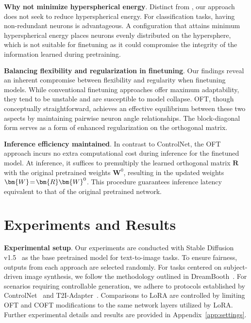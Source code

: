 \textbf{Why not minimize hyperspherical energy}. Distinct from \cite{liu2021orthogonal}, our approach does not seek to reduce hyperspherical energy. For classification tasks, having non-redundant neurons is advantageous. A configuration that attains minimum hyperspherical energy places neurons evenly distributed on the hypersphere, which is not suitable for finetuning as it could compromise the integrity of the information learned during pretraining.

\textbf{Balancing flexibility and regularization in finetuning}. Our findings reveal an inherent compromise between flexibility and regularity when finetuning models. While conventional finetuning approaches offer maximum adaptability, they tend to be unstable and are susceptible to model collapse. OFT, though conceptually straightforward, achieves an effective equilibrium between these two aspects by maintaining pairwise neuron angle relationships. The block-diagonal form serves as a form of enhanced regularization on the orthogonal matrix.

\textbf{Inference efficiency maintained}. In contrast to ControlNet, the OFT approach incurs no extra computational cost during inference for the finetuned model. At inference, it suffices to premultiply the learned orthogonal matrix $\bm{R}$ with the original pretrained weights $\bm{W}^0$, resulting in the updated weights $\thickmuskip=2mu \medmuskip=2mu \bm{W}=\bm{R}\bm{W}^0$. This procedure guarantees inference latency equivalent to that of the original pretrained network.

\section{Experiments and Results}

\textbf{Experimental setup}. Our experiments are conducted with Stable Diffusion v1.5~\cite{rombach2022high} as the base pretrained model for text-to-image tasks. To ensure fairness, outputs from each approach are selected randomly. For tasks centered on subject-driven image synthesis, we follow the methodology outlined in DreamBooth~\cite{ruiz2023dreambooth}. For scenarios requiring controllable generation, we adhere to protocols established by ControlNet~\cite{zhang2023adding} and T2I-Adapter~\cite{mou2023t2i}. Comparisons to LoRA are controlled by limiting OFT and COFT modifications to the same network layers utilized by LoRA. Further experimental details and results are provided in Appendix~\ref{app:settings}.


